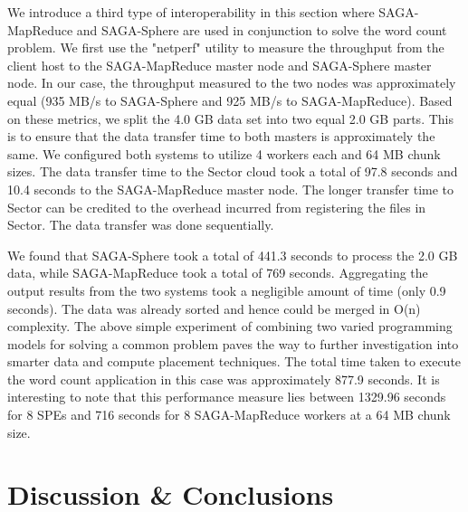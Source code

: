 \documentclass[3p,twocolumn]{elsarticle}
\begin{document}
We introduce a third type of interoperability in this section 
where SAGA-MapReduce and SAGA-Sphere are used in conjunction 
to solve the word count problem. We first use the "netperf" 
utility to measure the throughput from the client host to 
the SAGA-MapReduce master node and SAGA-Sphere master node. 
In our case, the throughput measured to the two nodes was 
approximately equal (935 MB/s to SAGA-Sphere and 925 MB/s to SAGA-MapReduce). 
Based on these metrics, we split the 4.0 GB data set 
into two equal 2.0 GB parts. This is to ensure that the data 
transfer time to both masters is approximately the same. We 
configured both systems to utilize 4 workers each 
and 64 MB chunk sizes. The data transfer time to the Sector 
cloud took a total of 97.8 seconds and 10.4 seconds to the 
SAGA-MapReduce master node. The longer transfer time to Sector 
can be credited to the overhead incurred from registering 
the files in Sector. The data transfer was done sequentially. 

We found that SAGA-Sphere took a total of 441.3 seconds to 
process the 2.0 GB data, while SAGA-MapReduce took a total of 
769 seconds. Aggregating the output results from the two systems 
took a negligible amount of time (only 0.9 seconds). The data was 
already sorted and hence could be merged in O(n) complexity. 
The above simple experiment of combining two varied programming 
models for solving a common problem paves the way to further 
investigation into smarter data and compute placement techniques. 
The total time taken to execute the word count application in this 
case was approximately 877.9 seconds. It is interesting to 
note that this performance measure lies between 1329.96 seconds 
for 8 SPEs and 716 seconds for 8 SAGA-MapReduce workers at 
a 64 MB chunk size. 



\section{Discussion \& Conclusions}
\label{sec:discuss}


\end{document}
